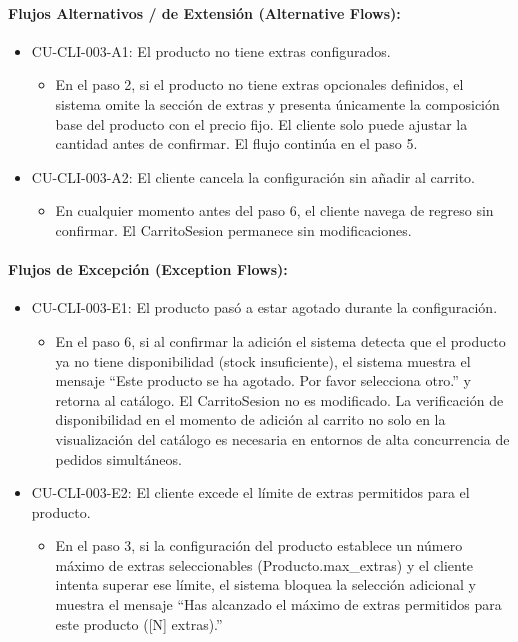 \paragraph{Flujos Alternativos / de Extensión (Alternative Flows):}
\begin{itemize}
    \item CU-CLI-003-A1: El producto no tiene extras configurados.
    \begin{itemize}
        \item En el paso 2, si el producto no tiene extras opcionales definidos, el sistema omite la sección de extras y presenta únicamente la composición base del producto con el precio fijo. El cliente solo puede ajustar la cantidad antes de confirmar. El flujo continúa en el paso 5.
    \end{itemize}
    \item CU-CLI-003-A2: El cliente cancela la configuración sin añadir al carrito.
    \begin{itemize}
        \item En cualquier momento antes del paso 6, el cliente navega de regreso sin confirmar. El CarritoSesion permanece sin modificaciones.
    \end{itemize}
\end{itemize}

\paragraph{Flujos de Excepción (Exception Flows):}
\begin{itemize}
    \item CU-CLI-003-E1: El producto pasó a estar agotado durante la configuración.
    \begin{itemize}
        \item En el paso 6, si al confirmar la adición el sistema detecta que el producto ya no tiene disponibilidad (stock insuficiente), el sistema muestra el mensaje ``Este producto se ha agotado. Por favor selecciona otro.'' y retorna al catálogo. El CarritoSesion no es modificado. La verificación de disponibilidad en el momento de adición al carrito no solo en la visualización del catálogo es necesaria en entornos de alta concurrencia de pedidos simultáneos.
    \end{itemize}
    \item CU-CLI-003-E2: El cliente excede el límite de extras permitidos para el producto.
    \begin{itemize}
        \item En el paso 3, si la configuración del producto establece un número máximo de extras seleccionables (Producto.max\_extras) y el cliente intenta superar ese límite, el sistema bloquea la selección adicional y muestra el mensaje ``Has alcanzado el máximo de extras permitidos para este producto ([N] extras).''
    \end{itemize}
\end{itemize}


